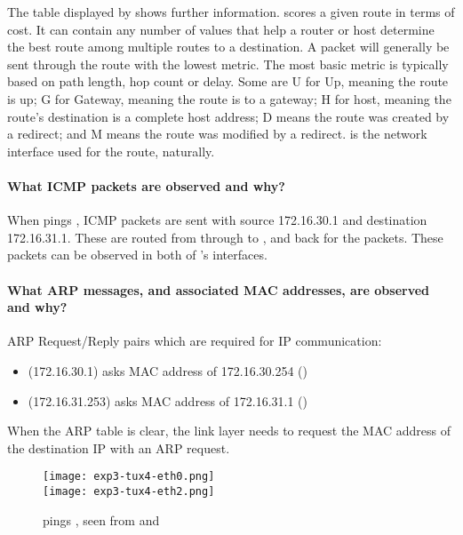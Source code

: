 \documentclass[compilation.tex]{subfiles}
\begin{document}
The table displayed by  shows further information.  scores a given route in terms of cost. It can contain any number of values that help a router or host determine the best route among multiple routes to a destination. A packet will generally be sent through the route with the lowest metric. The most basic metric is typically based on path length, hop count or delay. Some  are U for Up, meaning the route is up; G for Gateway, meaning the route is to a gateway; H for host, meaning the route's destination is a complete host address; D means the route was created by a redirect; and M means the route was modified by a redirect.  is the network interface used for the route, naturally.

\paragraph{What ICMP packets are observed and why?}
When  pings , ICMP  packets are sent with source 172.16.30.1 and destination 172.16.31.1. These are routed from  through  to , and back for the  packets. These packets can be observed in both of 's interfaces.

\paragraph{What ARP messages, and associated MAC addresses, are observed and why?}
ARP Request/Reply pairs which are required for IP communication:
\begin{itemize}[noitemsep,leftmargin=*,topsep=0pt]
\item {} (172.16.30.1) asks MAC address of 172.16.30.254 ()
\item {} (172.16.31.253) asks MAC address of 172.16.31.1 ()
\end{itemize}
When the ARP table is clear, the link layer needs to request the MAC address of the destination IP with an ARP request.

\begin{figure}[hbtp]
\centering
\texttt{[image: exp3-tux4-eth0.png]}\\
\vspace*{.8\baselineskip}
\texttt{[image: exp3-tux4-eth2.png]}
\caption{ pings , seen from  and }
\label{fig:exp3-tux4.png}
\end{figure}
\end{document}
